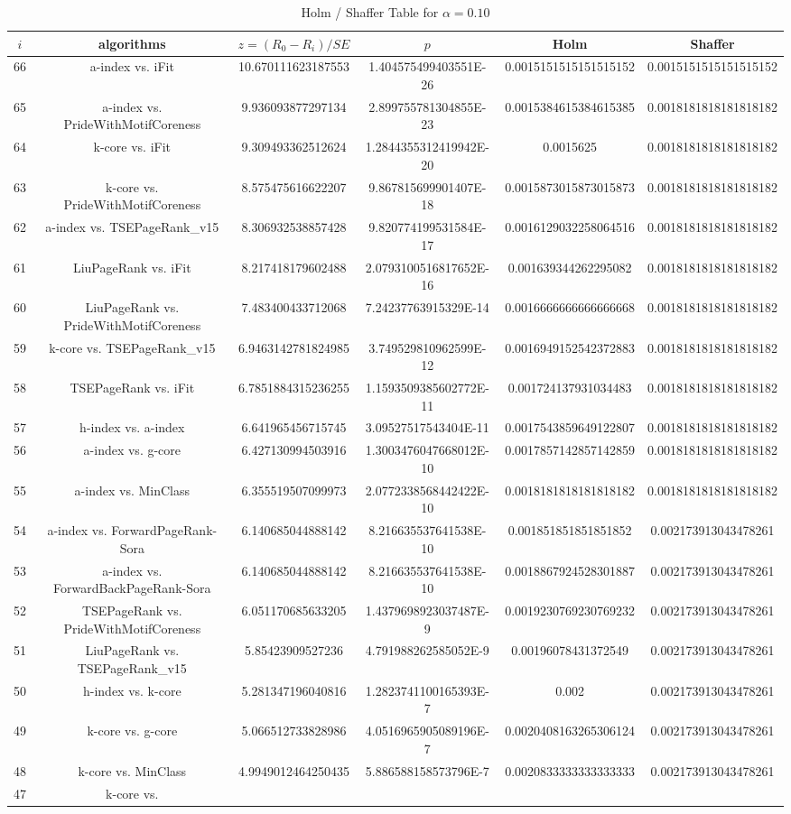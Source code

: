 \documentclass[a4paper,10pt]{article}
\begin{document}
\begin{landscape}
\begin{table}[!htp]
\centering\tiny
\caption{Holm / Shaffer Table for $\alpha=0.10$}
\begin{tabular}{cccccc}
$i$&algorithms&$z=(R_0 - R_i)/SE$&$p$&Holm&Shaffer\\
\hline
66&a-index vs. iFit&10.670111623187553&1.404575499403551E-26&0.0015151515151515152&0.0015151515151515152\\65&a-index vs. PrideWithMotifCoreness&9.936093877297134&2.899755781304855E-23&0.0015384615384615385&0.0018181818181818182\\64&k-core vs. iFit&9.309493362512624&1.2844355312419942E-20&0.0015625&0.0018181818181818182\\63&k-core vs. PrideWithMotifCoreness&8.575475616622207&9.867815699901407E-18&0.0015873015873015873&0.0018181818181818182\\62&a-index vs. TSEPageRank_v15&8.306932538857428&9.820774199531584E-17&0.0016129032258064516&0.0018181818181818182\\61&LiuPageRank vs. iFit&8.217418179602488&2.0793100516817652E-16&0.001639344262295082&0.0018181818181818182\\60&LiuPageRank vs. PrideWithMotifCoreness&7.483400433712068&7.24237763915329E-14&0.0016666666666666668&0.0018181818181818182\\59&k-core vs. TSEPageRank_v15&6.9463142781824985&3.749529810962599E-12&0.0016949152542372883&0.0018181818181818182\\58&TSEPageRank vs. iFit&6.7851884315236255&1.1593509385602772E-11&0.001724137931034483&0.0018181818181818182\\57&h-index vs. a-index&6.641965456715745&3.09527517543404E-11&0.0017543859649122807&0.0018181818181818182\\56&a-index vs. g-core&6.427130994503916&1.3003476047668012E-10&0.0017857142857142859&0.0018181818181818182\\55&a-index vs. MinClass&6.355519507099973&2.0772338568442422E-10&0.0018181818181818182&0.0018181818181818182\\54&a-index vs. ForwardPageRank-Sora&6.140685044888142&8.216635537641538E-10&0.001851851851851852&0.002173913043478261\\53&a-index vs. ForwardBackPageRank-Sora&6.140685044888142&8.216635537641538E-10&0.0018867924528301887&0.002173913043478261\\52&TSEPageRank vs. PrideWithMotifCoreness&6.051170685633205&1.4379698923037487E-9&0.0019230769230769232&0.002173913043478261\\51&LiuPageRank vs. TSEPageRank_v15&5.85423909527236&4.791988262585052E-9&0.00196078431372549&0.002173913043478261\\50&h-index vs. k-core&5.281347196040816&1.2823741100165393E-7&0.002&0.002173913043478261\\49&k-core vs. g-core&5.066512733828986&4.0516965905089196E-7&0.0020408163265306124&0.002173913043478261\\48&k-core vs. MinClass&4.9949012464250435&5.886588158573796E-7&0.0020833333333333333&0.002173913043478261\\47&k-core vs. 
\end{tabular}
\end{table}
\end{landscape}
\end{document}
